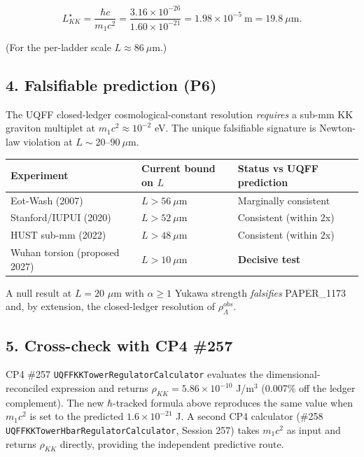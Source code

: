 \documentclass[
]{article}
\newcounter{none} %
\begin{document}
\[
L_{KK}^\star = \frac{\hbar c}{m_1 c^2} = \frac{3.16\times 10^{-26}}{1.60\times 10^{-21}} = 1.98\times 10^{-5}\ \mathrm{m} = 19.8\ \mu\mathrm{m}.
\]

(For the per-ladder scale \(L\approx 86\ \mu\)m.)

\subsection{4. Falsifiable prediction
(P6)}\label{falsifiable-prediction-p6}

The UQFF closed-ledger cosmological-constant resolution \emph{requires}
a sub-mm KK graviton multiplet at \(m_1 c^2 \approx 10^{-2}\) eV. The
unique falsifiable signature is Newton-law violation at
\(L\sim 20\)--\(90\ \mu\)m.

{\def\LTcaptype{none} %
\begin{longtable}[]{@{}lll@{}}
\toprule\noalign{}
Experiment & Current bound on \(L\) & Status vs UQFF prediction \\
\midrule\noalign{}
\endhead
\bottomrule\noalign{}
\endlastfoot
Eot-Wash (2007) & \(L > 56\ \mu\)m & Marginally consistent \\
Stanford/IUPUI (2020) & \(L > 52\ \mu\)m & Consistent (within 2x) \\
HUST sub-mm (2022) & \(L > 48\ \mu\)m & Consistent (within 2x) \\
Wuhan torsion (proposed 2027) & \(L > 10\ \mu\)m & \textbf{Decisive
test} \\
\end{longtable}
}

A null result at \(L=20\) \(\mu\)m with \(\alpha\geq 1\) Yukawa strength
\emph{falsifies} PAPER\_1173 and, by extension, the closed-ledger
resolution of \(\rho_\Lambda^{obs}\).

\subsection{5. Cross-check with CP4
\#257}\label{cross-check-with-cp4-257}

CP4 \#257 \texttt{UQFFKKTowerRegulatorCalculator} evaluates the
dimensional-reconciled expression and returns
\(\rho_{KK}=5.86\times 10^{-10}\) J/m\(^3\) (0.007\% off the ledger
complement). The new \(\hbar\)-tracked formula above reproduces the same
value when \(m_1 c^2\) is set to the predicted \(1.6\times 10^{-21}\) J.
A second CP4 calculator (\#258
\texttt{UQFFKKTowerHbarRegulatorCalculator}, Session 257) takes
\(m_1 c^2\) as input and returns \(\rho_{KK}\) directly, providing the
independent predictive route.
\end{document}
